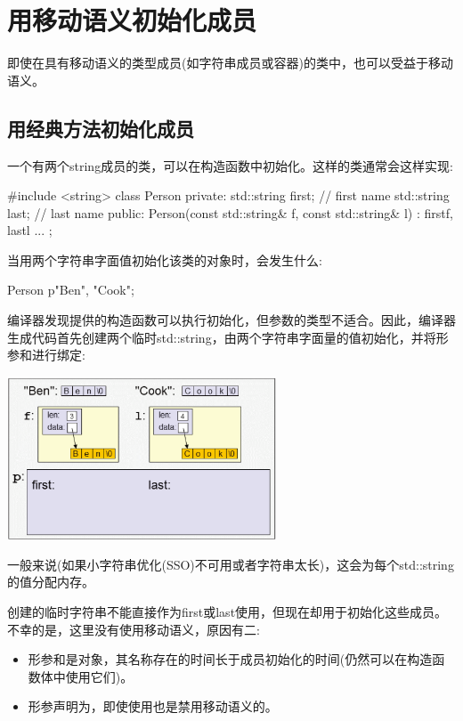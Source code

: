 \section{用移动语义初始化成员}
即使在具有移动语义的类型成员(如字符串成员或容器)的类中，也可以受益于移动语义。

\subsection{用经典方法初始化成员}

一个有两个string成员的类，可以在构造函数中初始化。这样的类通常会这样实现:

\begin{cppcode}
#include <string>
class Person {
private:
	std::string first; // first name
	std::string last; // last name
public:
	Person(const std::string& f, const std::string& l)
	: first{f}, last{l} {
	}
	...
};
\end{cppcode}

当用两个字符串字面值初始化该类的对象时，会发生什么:

\begin{cppcode}
Person p{"Ben", "Cook"};
\end{cppcode}

编译器发现提供的构造函数可以执行初始化，但参数的类型不适合。因此，编译器生成代码首先创建两个临时std::string，由两个字符串字面量的值初始化，并将形参和进行绑定:

\begin{center}
	\includegraphics[width=0.6\textwidth]{part1/ch4/images/1}
\end{center}

一般来说(如果小字符串优化(SSO)不可用或者字符串太长)，这会为每个std::string的值分配内存。

创建的临时字符串不能直接作为first或last使用，但现在却用于初始化这些成员。不幸的是，这里没有使用移动语义，原因有二:

\begin{itemize}
	\item 形参和是对象，其名称存在的时间长于成员初始化的时间(仍然可以在构造函数体中使用它们)。
	\item 形参声明为，即使使用也是禁用移动语义的。
\end{itemize}

